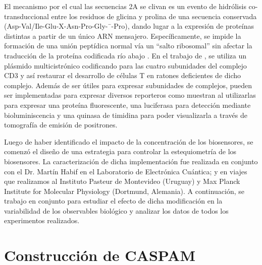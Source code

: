 El mecanismo por el cual las secuencias 2A se clivan es un evento de hidrólisis co-transduccional entre los residuos de glicina y prolina de una secuencia conservada (Asp-Val/Ile-Glu-X-Asn-Pro-Gly-¯-Pro), dando lugar a la expresión de proteínas distintas a partir de un único ARN mensajero. Específicamente, se impide la formación de una unión peptídica normal vía un ``salto ribosomal'' sin afectar la traducción de la proteína codificada río abajo \citep{Szymczak2005}. En el trabajo de \cite{Szymczak2004}, se utiliza un plásmido multicistrónico codificando para las cuatro subunidades del complejo CD3 y así restaurar el desarrollo de células T en ratones deficientes de dicho complejo. Además de ser útiles para expresar subunidades de complejos, pueden ser implementadas para expresar diversos reporteros como muestran \cite{Levin2014} al utilizarlas para expresar una proteína fluorescente, una luciferasa para detección mediante bioluminiscencia y una quinasa de timidina para poder visualizarla a través de tomografía de emisión de positrones.

Luego de haber identificado el impacto de la concentración de los biosensores, se comenzó el diseño de una estrategia para controlar la estequiometría de los biosensores. La caracterización de dicha implementación fue realizada en conjunto con el Dr. Martín Habif en el Laboratorio de Electrónica Cuántica; y en viajes que realizamos al Instituto Pasteur de Montevideo (Uruguay) y Max Planck Institute for Molecular Physiology (Dortmund, Alemania). A continuación, se trabajo en conjunto para estudiar el efecto de dicha modificación en la variabilidad de los observables biológico y analizar los datos de todos los experimentos realizados.


\section{Construcción de CASPAM}



